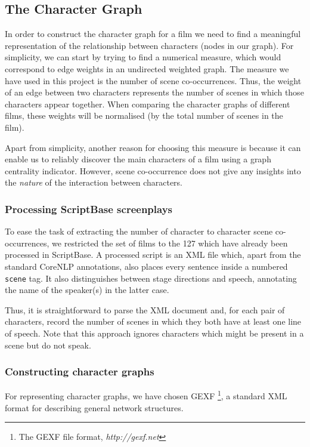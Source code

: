 \documentclass[bsc,frontabs,singlespacing,parskip]{infthesis} %
\begin{document}
\subsection{The Character Graph}
In order to construct the character graph for a film we need to find a meaningful representation of the relationship between characters (nodes in our graph). For simplicity, we can start by trying to find a numerical measure, which would correspond to edge weights in an undirected weighted graph. The measure we have used in this project is the number of scene co-occurrences. Thus, the weight of an edge between two characters represents the number of scenes in which those characters appear together. When comparing the character graphs of different films, these weights will be normalised (by the total number of scenes in the film).

Apart from simplicity, another reason for choosing this measure is because it can enable us to reliably discover the main characters of a film using a graph centrality indicator. However, scene co-occurrence does not give any insights into the \textit{nature} of the interaction between characters.

\subsubsection{Processing ScriptBase screenplays}
To ease the task of extracting the number of character to character scene co-occurrences, we restricted the set of films to the 127 which have already been processed in ScriptBase. A processed script is an XML file which, apart from the standard CoreNLP annotations, also places every sentence inside a numbered \texttt{scene} tag. It also distinguishes between stage directions and speech, annotating the name of the speaker(s) in the latter case.

Thus, it is straightforward to parse the XML document and, for each pair of characters, record the number of scenes in which they both have at least one line of speech. Note that this approach ignores characters which might be present in a scene but do not speak.

\subsubsection{Constructing character graphs}
For representing character graphs, we have chosen GEXF \footnote{The GEXF file format, \textit{http://gexf.net} }, a standard XML format for describing general network structures.
\end{document}
